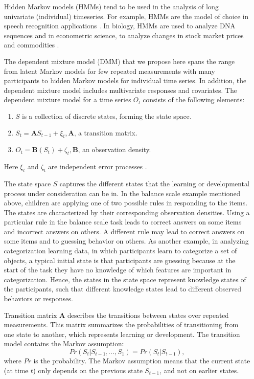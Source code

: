 \documentclass[a4paper,12pt,man]{apa} %
\newcommand{\mat}{\mathbf}
\begin{document}
Hidden Markov models (HMMs) tend to be used in the analysis of long
univariate (individual) timeseries.  For example, HMMs are the model
of choice in speech recognition applications \cite{Rabiner1989}.  In
biology, HMMs are used to analyze DNA sequences \cite{Krogh1998} and
in econometric science, to analyze changes in stock market prices and
commodities \cite{Kim1994}.

The dependent mixture model (DMM) that we propose here spans the range
from latent Markov models for few repeated measurements with many
participants to hidden Markov models for individual time series.  In
addition, the dependent mixture model includes multivariate responses
and covariates.  The dependent mixture model for a time series $O_{t}$
consists of the following elements:
\begin{enumerate}
	\item $S$ is a collection of discrete states, forming the state space.
	\item $S_{t} = \mat{A}S_{t-1}+\xi_{t}, \mat{A}$, a transition matrix.
	\item $O_{t} = \mat{B}(S_{t}) + \zeta_{t}, \mat{B}$,  an observation density.
\end{enumerate}
Here $\xi_{t}$ and $\zeta_{t}$ are independent error processes 
\cite{Elliott1995}. 

The state space $S$ captures the different states that the learning or
developmental process under consideration can be in.  In the balance
scale example mentioned above, children are applying one of two
possible rules in responding to the items.  The states are
characterized by their corresponding observation densities.  Using a
particular rule in the balance scale task leads to correct answers on
some items and incorrect answers on others.  A different rule may lead
to correct answers on some items and to guessing behavior on others.
As another example, in analyzing categorization learning data, in
which participants learn to categorize a set of objects, a typical
initial state is that participants are guessing because at the start
of the task they have no knowledge of which features are important in
categorization.  Hence, the states in the state space represent
knowledge states of the participants, such that different knowledge
states lead to different observed behaviors or responses.

Transition matrix $\mat{A}$ describes the transitions between states
over repeated measurements.  This matrix summarizes the probabilities
of transitioning from one state to another, which represents learning
or development.  The transition model contains the Markov assumption:
$$Pr(S_{t}|S_{t-1}, \ldots, S_{1}) = Pr(S_{t}|S_{t-1}),$$
where $Pr$ is the probability.  The Markov assumption means that the
current state (at time $t$) only depends on the previous state
$S_{t-1}$, and not on earlier states. 
\end{document}
